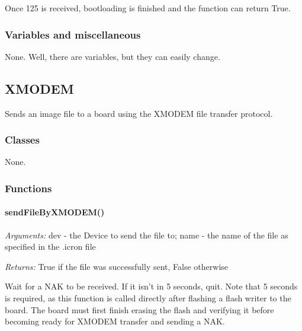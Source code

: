 \documentclass[12pt,letterpaper]{article}
\begin{document}
Once 125 is received, bootloading is finished and the function can return True.



%
%
\subsubsection{Variables and miscellaneous}
\label{4.8.2}

None. Well, there are variables, but they can easily change.



%
%
\subsection{XMODEM}
\label{4.9}

Sends an image file to a board using the XMODEM file transfer protocol.

\setcounter{subsubsection}{-1}



%
%
\subsubsection{Classes}
\label{4.9.0}

None.



%
%
\subsubsection{Functions}
\label{4.9.1}

\setcounter{paragraph}{-1}



%
%
\paragraph{sendFileByXMODEM()}
\label{4.9.1.0}

\emph{Arguments:} dev - the Device to send the file to; name - the name of the file as specified in the .icron file

\emph{Returns:} True if the file was successfully sent, False otherwise

Wait for a NAK to be received. If it isn't in 5 seconds, quit. Note that 5 seconds is required, as this function is called directly after flashing a flash writer to the board. The board must first finish erasing the flash and verifying it before becoming ready for XMODEM transfer and sending a NAK.
\end{document}
